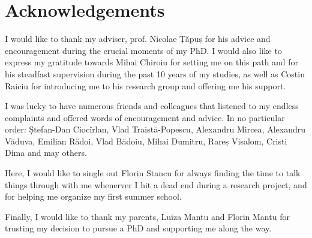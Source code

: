 \chapter*{Acknowledgements}
\thispagestyle{empty}

I would like to thank my adviser, prof. Nicolae Țăpuș for his advice and
encouragement during the crucial moments of my PhD. I would also like to express
my gratitude towards Mihai Chiroiu for setting me on this path and for his
steadfast supervision during the past 10 years of my studies, as well as Costin
Raiciu for introducing me to his research group and offering me his support.

I was lucky to have numerous friends and colleagues that listened to my endless
complaints and offered words of encouragement and advice. In no particular order:
Ștefan-Dan Ciocîrlan, Vlad Traistă-Popescu, Alexandru Mircea, Alexandru Văduva,
Emilian Rădoi, Vlad Bădoiu, Mihai Dumitru, Rareș Visalom, Cristi Dima and may others.

Here, I would like to single out Florin Stancu for always finding the time to
talk things through with me whenerver I hit a dead end during a research project,
and for helping me organize my first summer school.

Finally, I would like to thank my parents, Luiza Mantu and Florin Mantu for
trusting my decision to pursue a PhD and supporting me along the way.
